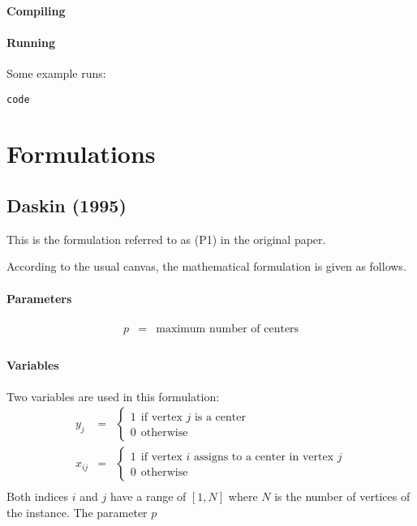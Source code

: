 \documentclass[a4paper,10pt]{article}
\begin{document}
\paragraph{Compiling}

\paragraph{Running}
Some example runs:
\begin{lstlisting}
code
\end{lstlisting}

\section{Formulations}
\subsection{Daskin (1995)}
	This is the formulation referred to as (P1) in the original paper.
	
	According to the usual canvas, the mathematical formulation is given as follows.
	\paragraph{Parameters} 
	\begin{eqnarray*}
		p &=& \text{maximum number of centers} \\
	\end{eqnarray*}
	\paragraph{Variables} Two variables are used in this formulation:
	\begin{eqnarray*}
		y_j &=& \begin{cases}
 				1 ~~\text{if vertex $j$ is a center} \\
 				0 ~~\text{otherwise}
 			\end{cases} \\
 		x_{ij} &=& \begin{cases}
 				1 ~~\text{if vertex $i$ assigns to a center in vertex $j$} \\
 				0 ~~\text{otherwise}
 			\end{cases} \\
	\end{eqnarray*}
	Both indices $i$ and $j$ have a range of $[1, N]$ where $N$ is the number of vertices of the instance. The parameter $p$ 	
\end{document}
